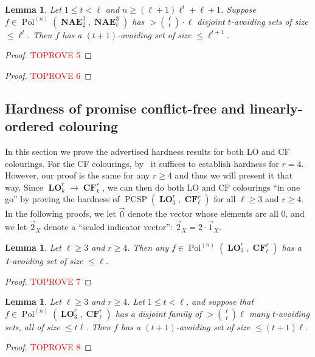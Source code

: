 \documentclass[a4paper,11pt]{article}
\newcommand{\2}{\vec{2}}
\newcommand{\1}{\vec{1}}
\newcommand{\0}{\vec{0}}
\DeclareMathOperator{\PCSP}{PCSP}
\DeclareMathOperator{\Pol}{Pol}
\DeclareMathOperator{\NAE}{\mathbf{NAE}}
\DeclareMathOperator{\CF}{\mathbf{CF}}
\DeclareMathOperator{\LO}{\mathbf{LO}}
\theoremstyle{plain}
\newtheorem{lemma}[theorem]{Lemma}
\theoremstyle{definition}
\begin{document}
\begin{lemma}\label{lem:lem2}
	Let $1\leq t < \ell$ and $n \geq (\ell+1) \ell^t + \ell+1$.
  Suppose $f \in \Pol^{(n)}(\NAE_2^3, \NAE_\ell^3)$ has $>\binom{\ell}{t}\cdot \ell$ disjoint $t$-avoiding sets of size $\leq \ell^t$.
	Then $f$ has a $(t+1)$-avoiding set of size $\leq \ell^{t+1}$.	
\end{lemma}
\begin{proof}\textcolor{red}{TOPROVE 5}\end{proof}

\main*

\begin{proof}\textcolor{red}{TOPROVE 6}\end{proof}

\subsection{Hardness of promise conflict-free and linearly-ordered colouring}
\label{sec:proof}

In this section we prove the advertised hardness results for both LO and CF
colourings. For the CF colourings, by~ it suffices to establish
hardness for $r=4$. However, our proof is the same for any $r\geq 4$ and thus we
will present it that way. Since $\LO^r_k\to\CF^r_k$, we can then do both LO and
CF colourings ``in one go'' by proving the hardness of $\PCSP(\LO_3^r, \CF_\ell^r)$ for all $\ell \geq 3$ and $r \geq 4$. 
In the following proofs, we let $\0$ denote the vector whose elements are all 0, and we let $\2_X$ denote a ``scaled indicator vector'': $\2_X = 2 \cdot \1_X$.

\begin{lemma}\label{lem:existence}
    Let $\ell \geq 3$ and $r\geq 4$.
    Then any $f \in \Pol^{(n)}(\LO_3^r, \CF_\ell^r)$ has a 1-avoiding set of size $\leq \ell$.
\end{lemma}
\begin{proof}\textcolor{red}{TOPROVE 7}\end{proof}

\begin{lemma} \label{lem:boosting}
  Let $  \ell \geq 3$ and $r\geq 4$. Let $1\leq t<\ell$, and suppose that $f\in \Pol^{(n)}(\LO_3^r, \CF_\ell^r)$ has a disjoint family of $> \binom{\ell}{t}\ell$ many $t$-avoiding sets, all of size $\leq t\ell$. Then $f$ has a $(t+1)$-avoiding set of size $\leq (t+1)\ell$.
\end{lemma}
\begin{proof}\textcolor{red}{TOPROVE 8}\end{proof}
\end{document}
